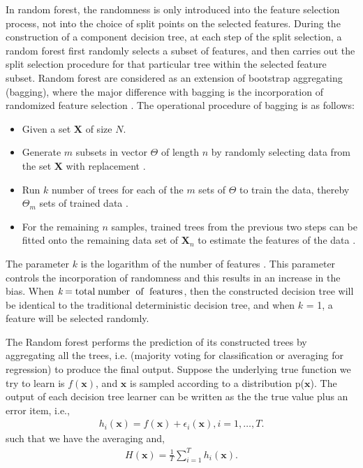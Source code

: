 In random forest, the randomness is only introduced into the feature selection process, not into the choice of split points on the selected features. During the construction of a component decision tree, at each step
of  the split selection, a random forest first randomly selects a subset of features, and then carries out the split selection procedure for that particular tree within the selected
feature subset. Random forest are considered as an extension of bootstrap aggregating (bagging), where the major difference with bagging is the incorporation of randomized feature selection \citep{zhou2012ensemble}. The operational procedure of bagging is as follows: 

\begin{itemize}
\item Given a  set $\textbf{X}$ of size $\textit{N}$.
\item Generate $\textit{m}$ subsets in vector $\Theta$  of length $\textit{n}$ by randomly selecting data from the set $\textbf{X}$ with replacement \citep{breiman2001random}. 
\item Run $\textit{k}$ number of trees for each of the $\textit{m}$ sets of $\Theta$ to train the data, thereby $\Theta_{\textit{m}}$ sets of trained data  \citep{breiman2001random}.
\item For the remaining $\textit{n}$ samples, trained trees from the previous two steps can be fitted onto the remaining
data set of $\textbf{X}_{\textit{n}}$ to estimate the features of the data  \citep{breiman2001random}.
\end{itemize}

The parameter $\textit{k}$ is the logarithm of the number of features \citep{breiman2001random}. This parameter controls the incorporation of randomness and this results in an increase in the bias. When $\textit{k} =  \text{total\;number\; of\; features}$, then the constructed decision tree will be identical to the traditional deterministic decision tree,  and when $\textit{k}$ = 1, a feature will be selected randomly.

The Random forest performs the prediction of its constructed trees by aggregating all the trees, i.e. (majority voting for classification or averaging for regression) to produce the final output. Suppose the underlying true function we try to learn is $f(\textbf{x})$, and $\textbf{x}$ is sampled according to a distribution p($\textbf{x}$). The output of each decision tree learner can be written as the the true value plus an error item, i.e.,
\begin{align}
h_{i}(\textbf{x})= f(\textbf{x}) + \epsilon_{i} (\textbf{x}), i = 1, \dots,T.
\label{hx}
\end{align}
such that we have the averaging and, 
\begin{align}
H(\textbf{x})= \frac{1}{T}\sum_{i=1}^{T} h_{i}(\textbf{x}). 
\label{averageRF}
\end{align}
\citep{zhou2012ensemble}

